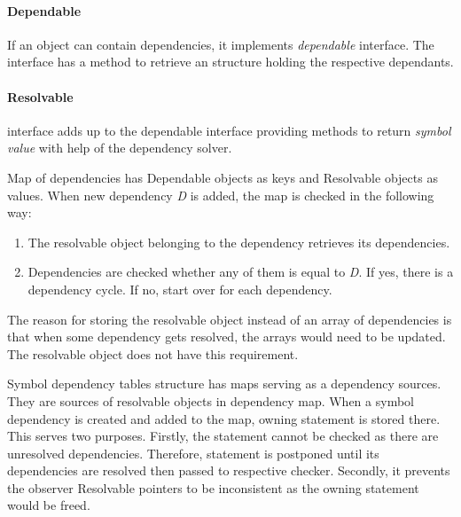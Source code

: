 \paragraph*{Dependable} If an object can contain dependencies, it implements \emph{dependable} interface. The interface has a method to retrieve an structure holding the respective dependants. 

\paragraph*{Resolvable} interface adds up to the dependable interface providing methods to return \emph{symbol value} with help of the dependency solver.

\vspace{0.5cm}

Map of dependencies has Dependable objects as keys and Resolvable objects as values. When new dependency \emph{D} is added, the map is checked in the following way:
\begin{enumerate}
	\item The resolvable object belonging to the dependency retrieves its dependencies.
	\item Dependencies are checked whether any of them is equal to \emph{D}. If yes, there is a dependency cycle. If no, start over for each dependency. 
\end{enumerate}

The reason for storing the resolvable object instead of an array of dependencies is that when some dependency gets resolved, the arrays would need to be updated. The resolvable object does not have this requirement.

Symbol dependency tables structure has maps serving as a dependency sources. They are sources of resolvable objects in dependency map. When a symbol dependency is created and added to the map, owning statement is stored there. This serves two purposes. Firstly, the statement cannot be checked as there are unresolved dependencies. Therefore, statement is postponed until its dependencies are resolved then passed to respective checker. Secondly, it prevents the observer Resolvable pointers to be inconsistent as the owning statement would be freed.